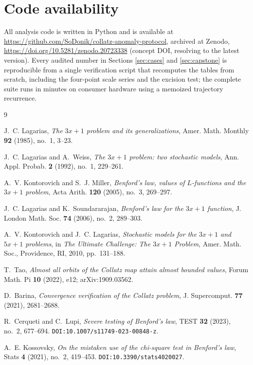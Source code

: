 \documentclass[11pt]{amsart}
\begin{document}
\section*{Code availability}\label{sec:code}

All analysis code is written in Python and is available at \url{https://github.com/SoDonik/collatz-anomaly-protocol}, archived at Zenodo, \url{https://doi.org/10.5281/zenodo.20723338} (concept DOI, resolving to the latest version). Every audited number in Sections \ref{sec:cases} and \ref{sec:capstone} is reproducible from a single verification script that recomputes the tables from scratch, including the four-point scale series and the excision test; the complete suite runs in minutes on consumer hardware using a memoized trajectory recurrence.

\begin{thebibliography}{9}

J.~C. Lagarias, \emph{The $3x+1$ problem and its generalizations}, Amer. Math. Monthly \textbf{92} (1985), no.~1, 3--23.

J.~C. Lagarias and A.~Weiss, \emph{The $3x+1$ problem: two stochastic models}, Ann. Appl. Probab. \textbf{2} (1992), no.~1, 229--261.

A.~V. Kontorovich and S.~J. Miller, \emph{Benford's law, values of $L$-functions and the $3x+1$ problem}, Acta Arith. \textbf{120} (2005), no.~3, 269--297.

J.~C. Lagarias and K.~Soundararajan, \emph{Benford's law for the $3x+1$ function}, J. London Math. Soc. \textbf{74} (2006), no.~2, 289--303.

A.~V. Kontorovich and J.~C. Lagarias, \emph{Stochastic models for the $3x+1$ and $5x+1$ problems}, in \emph{The Ultimate Challenge: The $3x+1$ Problem}, Amer. Math. Soc., Providence, RI, 2010, pp.~131--188.

T.~Tao, \emph{Almost all orbits of the Collatz map attain almost bounded values}, Forum Math. Pi \textbf{10} (2022), e12; arXiv:1909.03562.

D.~Barina, \emph{Convergence verification of the Collatz problem}, J. Supercomput. \textbf{77} (2021), 2681--2688.

R.~Cerqueti and C.~Lupi, \emph{Severe testing of Benford's law}, TEST \textbf{32} (2023), no.~2, 677--694. \texttt{DOI:10.1007/s11749-023-00848-z}.

A.~E. Kossovsky, \emph{On the mistaken use of the chi-square test in Benford's law}, Stats \textbf{4} (2021), no.~2, 419--453. \texttt{DOI:10.3390/stats4020027}.

\end{thebibliography}
\end{document}
